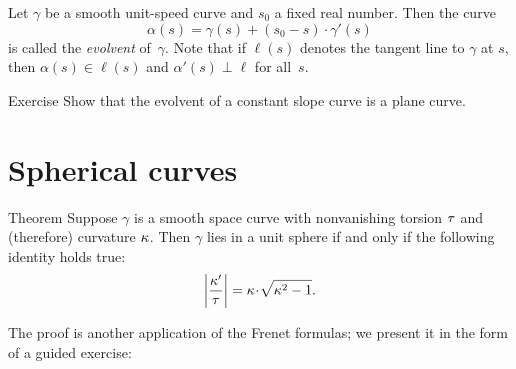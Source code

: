 Let $\gamma$ be a smooth unit-speed curve and $s_0$ a fixed real number. 
Then the curve 
\[\alpha(s)=\gamma(s)+(s_0-s)\cdot \gamma'(s)\]
is called the \emph{evolvent} of~$\gamma$.
Note that if $\ell(s)$ denotes the tangent line to $\gamma$ at $s$,
then $\alpha(s)\in \ell(s)$ and $\alpha'(s)\perp \ell$ for all~$s$.

\begin{thm}{Exercise}\label{ex:evolvent-constant-slope}
Show that the evolvent of a constant slope curve is a plane curve.
\end{thm}

\section{Spherical curves}

\begin{thm}{Theorem}
Suppose $\gamma$ is a smooth space curve with nonvanishing torsion $\tau$ and (therefore) curvature $\kappa$.
Then $\gamma$ lies in a unit sphere if and only if 
the following identity holds true:
\[\left|\frac{\kur'}{\tor}\right|=\kur\cdot\sqrt{\kur^2-1}.\]
\end{thm}

The proof is another application of the Frenet formulas;
we present it in the form of a guided exercise:

